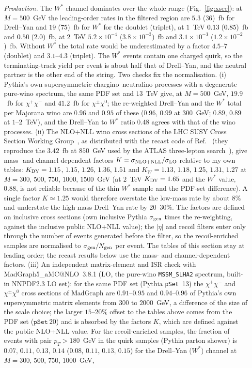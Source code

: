 \documentclass[prd,twocolumn,nofootinbib,superscriptaddress,amsmath,amssymb]{revtex4-2}
\begin{document}
\emph{Production.} The $W^*$ channel dominates over the whole range (Fig.~\ref{fig:xsec}): at $M=500$~GeV the leading-order rates in the filtered region are $5.3$ ($36$)~fb for Drell--Yan and $19$ ($75$)~fb for $W^*$ for the doublet (triplet), at $1$~TeV $0.13$ ($0.85$)~fb and $0.50$ ($2.0$)~fb, at $2$~TeV $5.2\times10^{-4}$ ($3.8\times10^{-3}$)~fb and $3.1\times10^{-3}$ ($1.2\times10^{-2}$)~fb. Without $W^*$ the total rate would be underestimated by a factor $4.5$--$7$ (doublet) and $3.1$--$4.3$ (triplet). The $W^*$ events contain one charged quirk, so the terminating-track yield per event is about half that of Drell--Yan, and the neutral partner is the other end of the string. Two checks fix the normalisation. (i) Pythia's own supersymmetric chargino--neutralino processes with a degenerate pure-wino spectrum, the same PDF set and $13$~TeV give, at $M=500$~GeV, $19.9$~fb for $\chi^+\chi^-$ and $41.2$~fb for $\chi^\pm\chi^0$; the re-weighted Drell--Yan and the $W^*$ total per Majorana wino are $0.96$ and $0.95$ of these ($0.96$, $0.99$ at $300$~GeV; $0.89$, $0.89$ at $1$--$2$~TeV), and the Drell--Yan to $W^*$ ratio $0.48$ agrees with that of the wino processes. (ii) The NLO+NLL wino cross sections of the LHC SUSY Cross Section Working Group~\cite{SUSYXS}, as distributed with the recast code of Ref.~\cite{RecastingCodes} (they reproduce the $3.42$~fb at $850$~GeV used by the ATLAS three-lepton search~\cite{ATLAS:3l}), give mass- and channel-dependent factors $K=\sigma_{\rm NLO+NLL}/\sigma_{\rm LO}$ relative to my own tables: $K_{\rm DY}=1.15$, $1.15$, $1.26$, $1.36$, $1.51$ and $K_W=1.13$, $1.18$, $1.25$, $1.31$, $1.27$ at $M=300$, $500$, $750$, $1000$, $1500$~GeV (at $2$~TeV $K_{\rm DY}=1.65$ and the $W^*$ value, $0.88$, is not reliable because of the thin $W^*$ sample and the PDF-set difference). A single factor $K\simeq1.25$ would therefore overstate the low-mass rate by about $8\%$ and understate the high-mass Drell--Yan rate by $20$--$30\%$. The factors are defined on inclusive cross sections (own inclusive Pythia $\sigma_{\rm gen}$ times the re-weighting, against the inclusive public NLO+NLL value); the $|\eta|$ and recoil filters enter only through the number of events generated before the filter, so the recoil-enriched samples are normalised to $\sigma_{\rm gen}/N_{\rm gen}$ per event. The tables of this section stay at leading order; the recast results below use the mass- and channel-dependent factors. (iii) An independent matrix-element and ISR check with MadGraph5\_aMC@NLO~3.8.1 (LO, the pure-wino \texttt{MSSM\_SLHA2} spectrum, built-in NNPDF2.3 LO set): for the same PDF set (Pythia \texttt{pSet}~13) the $\chi^+\chi^-$ and $\chi^\pm\chi^0$ cross sections of MadGraph are $0.91$--$0.95$ and $0.94$--$0.96$ of Pythia's own supersymmetric matrix elements from $300$ to $2000$~GeV, a difference of the size of the scale choice; the larger $15$--$20\%$ offset to the tables above comes from the PDF set ($\texttt{pSet}~20$) and is absorbed by the factors $K$, which are defined against the public NLO+NLL value. For the recoil-enriched samples, the fraction of events with pair $p_T>180$~GeV in the quirk samples (Pythia parton shower) is $0.07$, $0.11$, $0.13$, $0.14$ ($0.08$, $0.11$, $0.13$, $0.15$) for the Drell--Yan ($W^*$) channel at $M=300$, $500$, $750$, $1000$~GeV, 
\end{document}
